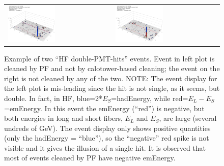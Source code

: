 %
\begin{figure}[h]
 \centering
 \begin{tabular}{ll}
   \includegraphics[width=0.47\textwidth]{fig/HFdoubleHit.eps} &
   \includegraphics[width=0.47\textwidth]{fig/HFdoubleHit_1.eps} \\
 \end{tabular}
\caption{Example of two ``HF double-PMT-hits'' events. Event in left plot is cleaned by PF and not by 
calotower-based cleaning; the event on the right is not cleaned by any of the two. 
NOTE: The event display for the left plot is mis-leading since the hit is not single, 
as it seems, but double. In fact, in HF, blue=2*$E_{S}$=hadEnergy, while red=$E_{L}-E_{S}$=emEnergy. 
In this event the emEnergy (``red'') is negative, but both energies in long and short fibers, $E_{L}$ and $E_{S}$, are large
(several undreds of GeV). The event display only shows positive quantities 
(only the hadEnergy = ``blue''), so the ``negative'' red spike is not visible and it gives the illusion of a single hit. 
It is observed that most of events cleaned by PF have negative emEnergy.}
\label{fig:HFdoublehits}
\end{figure}

